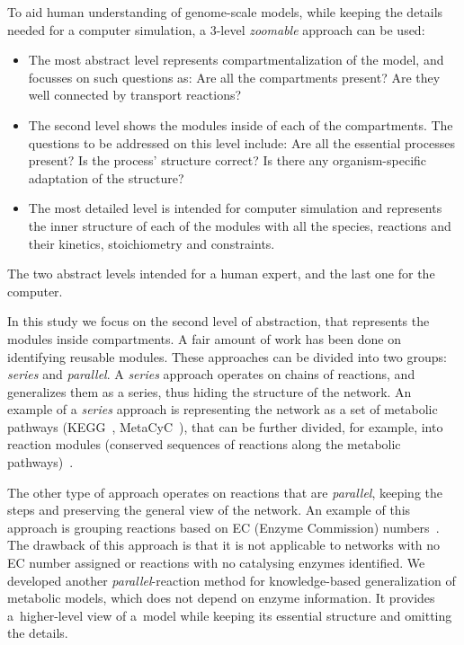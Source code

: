 \documentclass[9pt]{article}
\newcounter{rm}
\begin{document}
To aid human understanding of genome-scale models, while keeping the details needed for a computer simulation, a 3-level \emph{zoomable} approach can be used:
\begin{itemize}
%
\item
The most abstract level represents compartmentalization of the model, and focusses on such questions as: Are all the compartments present? Are they well connected by transport reactions? 
%
\item
The second level shows the modules inside of each of the compartments. The questions to be addressed on this level include: Are all the essential processes present? Is the process' structure correct? Is there any organism-specific adaptation of the structure?
%
\item
The most detailed level is intended for computer simulation and represents the inner structure of each of the modules with all the species, reactions and their kinetics, stoichiometry and constraints.
\end{itemize}
The two abstract levels intended for a human expert, and the last one for the computer.

In this study we focus on the second level of abstraction, that represents the modules inside compartments. A fair amount of work has been done on identifying reusable modules. These approaches can be divided into two groups: \emph{series} and \emph{parallel}. A \emph{series} approach operates on chains of reactions, and generalizes them as a series, thus hiding the structure of the network. An example of a \emph{series} approach is representing the network as a set of metabolic pathways (KEGG~\citep{Kanehisa12}, MetaCyC~\citep{Caspi2012}), that can be further divided, for example, into reaction modules (conserved sequences of reactions along the metabolic pathways)~\citep{Muto2013}. 

The other type of approach operates on reactions that are \emph{parallel},  keeping the steps and preserving the general view of the network. An example of this approach is grouping reactions based on EC (Enzyme Commission) numbers~\citep{Tohsato2000}. The drawback of this approach is that it is not applicable to networks with no EC number assigned or reactions with no catalysing enzymes identified. 
We developed another \emph{parallel}-reaction method for knowledge-based generalization of metabolic models, which does not depend on enzyme information. It provides a~higher-level view of a~model while keeping its essential structure and omitting the details. 
\end{document}
